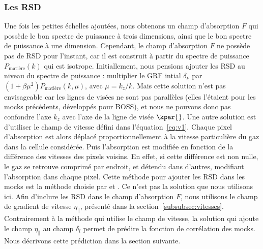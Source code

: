 \subsubsection{Les RSD}
\label{subsubsec:rsdlya}
Une fois les petites échelles ajoutées, nous obtenons un champ d'absorption $F$ qui possède le bon spectre de puissance à trois dimensions, ainsi que le bon spectre de puissance à une dimension.
Cependant, le champ d'absorption $F$ ne possède pas de RSD pour l'instant, car il est construit à partir du spectre de puissance $P_{\mathrm{matière}}(k)$ qui est isotrope.
Initiallement, nous pensions ajouter les RSD au niveau du spectre de puissance : multiplier le GRF intial $\delta_k$ par $(1 + \beta \mu^2)P_{\mathrm{matière}}(k, \mu)$, avec $\mu = k_z / k$.
Mais cette solution n'est pas envisageable car les lignes de visées ne sont pas parallèles (elles l'étaient pour les mocks précédents, développés pour BOSS), et nous ne pouvons donc pas confondre l'axe $k_z$ avec l'axe de la ligne de visée $\kpar{}$.
Une autre solution est d'utiliser le champ de vitesse défini dans l'équation~\ref{eq:v1}. Chaque pixel d'absorption est alors déplacé proportionnellement à la vitesse particulière du gaz dans la cellule considérée. Puis l'absorption est modifiée en fonction de la différence des vitesses des pixels voisins. En effet, si cette différence est non nulle, le gaz se retrouve comprimé par endroit, et détendu dans d'autres, modifiant l'absorption dans chaque pixel.
Cette méthode pour ajouter les RSD dans les mocks \lya{} est la méthode choisie par \textcite{LeGoff2011} et \textcite{Farr2019}.
Ce n'est pas la solution que nous utilisons ici. Afin d'inclure les RSD dans le champ d'absorption $F$, nous utilisons le champ de gradient de vitesse $\eta_{\parallel}$, présenté dans la section~\ref{subsubsec:vitesses}.
Contrairement à la méthode qui utilise le champ de vitesse, la solution qui ajoute le champ $\eta_{\parallel}$ au champ $\delta_l$ permet de prédire la fonction de corrélation des mocks. Nous décrivons cette prédiction dans la section suivante.


